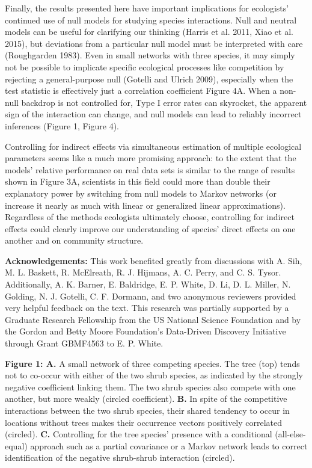\documentclass[12pt,]{article}
\begin{document}
\begin{spacing}{1.9}
\begin{flushleft}
Finally, the results presented here have important implications for
ecologists' continued use of null models for studying species
interactions. Null and neutral models can be useful for clarifying our
thinking (Harris et al. 2011, Xiao et al. 2015), but deviations from a
particular null model must be interpreted with care (Roughgarden 1983).
Even in small networks with three species, it may simply not be possible
to implicate specific ecological processes like competition by rejecting
a general-purpose null (Gotelli and Ulrich 2009), especially when the
test statistic is effectively just a correlation coefficient Figure 4A.
When a non-null backdrop is not controlled for, Type I error rates can
skyrocket, the apparent sign of the interaction can change, and null
models can lead to reliably incorrect inferences (Figure 1, Figure 4).

Controlling for indirect effects via simultaneous estimation of multiple
ecological parameters seems like a much more promising approach: to the
extent that the models' relative performance on real data sets is
similar to the range of results shown in Figure 3A, scientists in this
field could more than double their explanatory power by switching from
null models to Markov networks (or increase it nearly as much with
linear or generalized linear approximations). Regardless of the methods
ecologists ultimately choose, controlling for indirect effects could
clearly improve our understanding of species' direct effects on one
another and on community structure.

\noindent \textbf{Acknowledgements:} This work benefited greatly from
discussions with A. Sih, M. L. Baskett, R. McElreath, R. J. Hijmans, A.
C. Perry, and C. S. Tysor. Additionally, A. K. Barner, E. Baldridge, E.
P. White, D. Li, D. L. Miller, N. Golding, N. J. Gotelli, C. F. Dormann,
and two anonymous reviewers provided very helpful feedback on the text.
This research was partially supported by a Graduate Research Fellowship
from the US National Science Foundation and by the Gordon and Betty
Moore Foundation's Data-Driven Discovery Initiative through Grant
GBMF4563 to E. P. White.

\setlength{\parindent}{0cm}

\noindent \textbf{Figure 1: A.} A small network of three competing
species. The tree (top) tends not to co-occur with either of the two
shrub species, as indicated by the strongly negative coefficient linking
them. The two shrub species also compete with one another, but more
weakly (circled coefficient). \textbf{B.} In spite of the competitive
interactions between the two shrub species, their shared tendency to
occur in locations without trees makes their occurrence vectors
positively correlated (circled). \textbf{C.} Controlling for the tree
species' presence with a conditional (all-else-equal) approach such as a
partial covariance or a Markov network leads to correct identification
of the negative shrub-shrub interaction (circled).


\end{flushleft}
\end{spacing}
\end{document}
